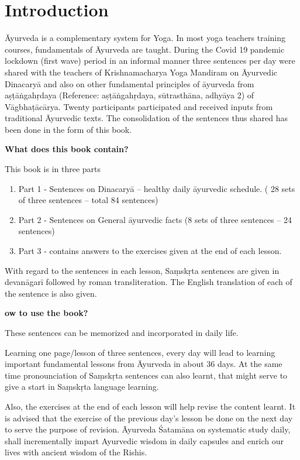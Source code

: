 \thispagestyle{empty}

\chapter*{Introduction}

Āyurveda is a complementary system for Yoga. In most yoga teachers training courses, fundamentals of Āyurveda are taught. During the Covid 19 pandemic lockdown (first wave) period in an informal manner three sentences per day were shared with the teachers of Krishnamacharya Yoga Mandiram on Āyurvedic Dinacaryā and also on other fundamental principles of āyurveda from aṣṭāṅgahṛdaya (Reference: aṣṭāṅgahṛdaya,  sūtrasthāna, adhyāya 2) of Vāgbhaṭācārya. Twenty participants participated and received inputs from traditional Āyurvedic texts. The consolidation of the sentences thus shared has been done in the form of this book.

\noindent \textbf{What does this book contain?}

This book is in three parts 

\begin{enumerate}
\renewcommand{\theenumi}{\alph{enumi}}
\renewcommand{\labelenumi}{\theenumi.}
\item Part 1 - Sentences on Dinacaryā – healthy daily āyurvedic schedule. ( 28 sets of three sentences – total 84 sentences)
\item Part 2 - Sentences on General āyurvedic facts (8 sets of three sentences – 24 sentences) 
\item Part 3 - contains answers to the exercises given at the end of each lesson.
\end{enumerate}

With regard to the sentences in each lesson, Saṃskṛta sentences are given in devanāgarī   followed by roman transliteration. The English translation of each of the sentence is also given.

\noindent \textbf{ow to use the book?}

These sentences can be memorized and incorporated in daily life. 

Learning one page/lesson of three sentences, every day will lead to learning important fundamental lessons from Āyurveda in about 36 days. At the same time pronounciation of Saṃskṛta sentences can also learnt, that might serve to give a start in Saṃskṛta language learning.

Also, the exercises at the end of each lesson will help revise the content learnt. It is advised that the exercise of the previous day’s lesson be done on the next day to serve the purpose of revision.  Āyurveda Śatamāna on systematic study daily, shall incrementally impart Ayurvedic wisdom in daily capsules and enrich our lives with ancient wisdom of the Rishis.

